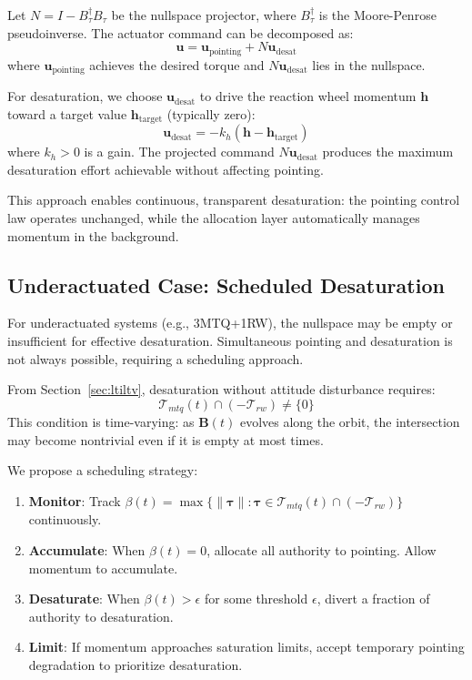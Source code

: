\documentclass[conference]{IEEEtran}
\begin{document}
Let $N = I - B_\tau^\dagger B_\tau$ be the nullspace projector, where $B_\tau^\dagger$ is the Moore-Penrose pseudoinverse. The actuator command can be decomposed as:
\begin{equation}
\mathbf{u} = \mathbf{u}_{\text{pointing}} + N \mathbf{u}_{\text{desat}}
\end{equation}
where $\mathbf{u}_{\text{pointing}}$ achieves the desired torque and $N \mathbf{u}_{\text{desat}}$ lies in the nullspace.

For desaturation, we choose $\mathbf{u}_{\text{desat}}$ to drive the reaction wheel momentum $\mathbf{h}$ toward a target value $\mathbf{h}_{\text{target}}$ (typically zero):
\begin{equation}
\mathbf{u}_{\text{desat}} = -k_h (\mathbf{h} - \mathbf{h}_{\text{target}})
\end{equation}
where $k_h > 0$ is a gain. The projected command $N \mathbf{u}_{\text{desat}}$ produces the maximum desaturation effort achievable without affecting pointing.

This approach enables continuous, transparent desaturation: the pointing control law operates unchanged, while the allocation layer automatically manages momentum in the background.

\subsection{Underactuated Case: Scheduled Desaturation}
For underactuated systems (e.g., 3MTQ+1RW), the nullspace may be empty or insufficient for effective desaturation. Simultaneous pointing and desaturation is not always possible, requiring a scheduling approach.

From Section~\ref{sec:ltiltv}, desaturation without attitude disturbance requires:
\begin{equation}
\mathcal{T}_{mtq}(t) \cap (-\mathcal{T}_{rw}) \neq \{0\}
\end{equation}
This condition is time-varying: as $\mathbf{B}(t)$ evolves along the orbit, the intersection may become nontrivial even if it is empty at most times.

We propose a scheduling strategy:
\begin{enumerate}
    \item \textbf{Monitor}: Track $\beta(t) = \max\{\|\boldsymbol{\tau}\| : \boldsymbol{\tau} \in \mathcal{T}_{mtq}(t) \cap (-\mathcal{T}_{rw})\}$ continuously.
    \item \textbf{Accumulate}: When $\beta(t) = 0$, allocate all authority to pointing. Allow momentum to accumulate.
    \item \textbf{Desaturate}: When $\beta(t) > \epsilon$ for some threshold $\epsilon$, divert a fraction of authority to desaturation.
    \item \textbf{Limit}: If momentum approaches saturation limits, accept temporary pointing degradation to prioritize desaturation.
\end{enumerate}
\end{document}

